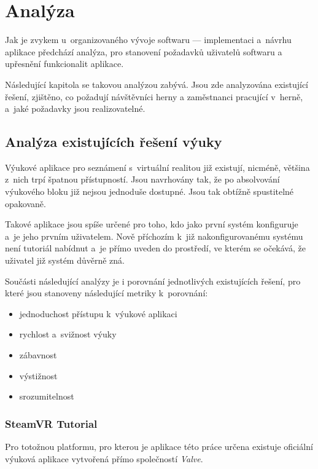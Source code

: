 \chapter{Analýza}\label{analuxfdza}

Jak je zvykem u~organizovaného vývoje softwaru --- implementaci a~návrhu
aplikace předchází analýza, pro stanovení požadavků uživatelů softwaru a
upřesnění funkcionalit aplikace.

Následující kapitola se takovou analýzou zabývá. Jsou zde analyzována
existující řešení, zjištěno, co požadují návštěvníci herny a
zaměstnanci pracující v~herně, a~jaké požadavky jsou realizovatelné.

\section{Analýza existujících řešení
výuky}\label{analuxfdza-existujuxedcuxedch-ux159eux161enuxed-vuxfduky}

Výukové aplikace pro seznámení s~virtuální realitou již existují,
nicméně, většina z~nich trpí špatnou přístupností. Jsou navrhovány tak,
že po absolvování výukového bloku již nejsou jednoduše dostupné. Jsou tak
obtížně spustitelné opakovaně.

Takové aplikace jsou spíše určené pro toho, kdo jako první systém
konfiguruje a~je jeho prvním uživatelem. Nově příchozím
k~již nakonfigurovanému systému není tutoriál nabídnut a~je přímo uveden do
prostředí, ve kterém se očekává, že uživatel již systém důvěrně zná.

\newpage 

Součásti následující analýzy je i porovnání jednotlivých existujících řešení, pro
které jsou stanoveny následující metriky k~porovnání:

\begin{itemize}
\tightlist
\item
  jednoduchost přístupu k~výukové aplikaci
\item
  rychlost a~svižnost výuky
\item
  zábavnost
\item
  výstižnost
\item
  srozumitelnost
\end{itemize}

\subsection{SteamVR Tutorial}\label{steamvr-tutorial}

Pro totožnou platformu, pro kterou je aplikace této práce
určena existuje oficiální výuková aplikace vytvořená přímo společností
\emph{Valve}.


